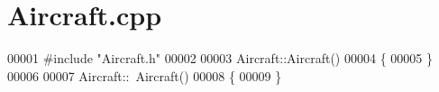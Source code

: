 \hypertarget{_aircraft_8cpp_source}{}\section{Aircraft.\+cpp}
\label{_aircraft_8cpp_source}

\begin{DoxyCode}
00001 \textcolor{preprocessor}{#include "Aircraft.h"}
00002 
00003 Aircraft::Aircraft()
00004 \{
00005 \}
00006 
00007 Aircraft::~Aircraft()
00008 \{
00009 \}
\end{DoxyCode}
